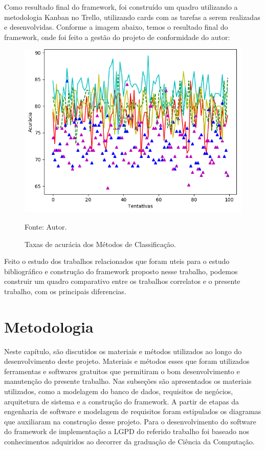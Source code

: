 \documentclass[
	12pt,				%
	openright,			%
	oneside,			%
	a4paper,			%
	english,			%
	french,				%
	spanish,			%
	brazil,				%
	]{abntex2}
\begin{document}
Como resultado final do framework, foi construído um quadro utilizando a metodologia Kanban no Trello, utilizando cards com as tarefas a serem realizadas e desenvolvidas. Conforme a imagem abaixo, temos o resultado final do framework, onde foi feito a gestão do projeto de conformidade do autor:

\begin{figure}[ht]
    \centering
    \caption{Taxas de acurácia dos Métodos de Classificação.}
    \includegraphics[width=5.0in]{Images/acc-classification.png}
    \label{fig: grafico-acc}
    
    \centering \small Fonte: Autor.
\end{figure}

Feito o estudo dos trabalhos relacionados que foram uteis para o estudo bibliográfico e construção do framework proposto nesse trabalho, podemos construir um quadro comparativo entre os trabalhos correlatos e o presente trabalho, com os principais diferencias.





\chapter{Metodologia}
\label{ch: materiais e métodos}

Neste capítulo, são discutidos os materiais e métodos utilizados ao longo do desenvolvimento deste projeto. Materiais e métodos esses que foram utilizados ferramentas e softwares gratuitos que permitiram o bom desenvolvimento e manutenção do presente trabalho.
Nas subseções são apresentados os materiais utilizados, como a modelagem do banco de dados, requisitos de negócios, arquitetura de sistema e a construção do framework. A partir de etapas da engenharia de software e modelagem de requisitos foram estipulados os diagramas que auxiliaram na construção desse projeto.
Para o desenvolvimento do software do framework de implementação a LGPD do referido trabalho foi baseado nos conhecimentos adquiridos ao decorrer da graduação de Ciência da Computação.
\end{document}
